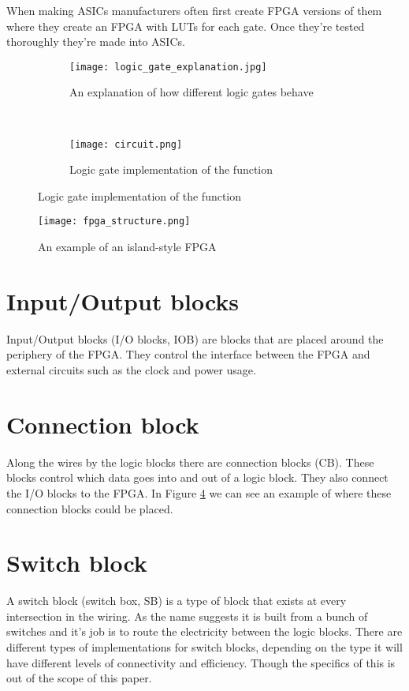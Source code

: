 When making ASICs manufacturers often first create FPGA versions of them where
they create an FPGA with LUTs for each gate. Once they're tested thoroughly
they're made into ASICs.

\begin{figure}[H]
    \centering
    \begin{subfigure}[b]{.4\textwidth}
        \centering
        \texttt{[image: logic\_gate\_explanation.jpg]}
        \caption{An explanation of how different logic gates behave\citep{LogicGateBehavior}}
        \label{fig:logic_gate_explanation}
    \end{subfigure}
    ~
    \begin{subfigure}[b]{.4\textwidth}
        \centering
        \texttt{[image: circuit.png]}
        \caption{Logic gate implementation of the function}
        \label{fig:logic_gate_impl}
    \end{subfigure}
\end{figure}

\begin{figure}[H]
    \centering
    \texttt{[image: fpga\_structure.png]}
    \caption{An example of an island-style FPGA\citep{M.MorrisMano3}}
    \label{fig:fpga_structure}
\end{figure}

\section{Input/Output blocks}
Input/Output blocks (I/O blocks, IOB) are blocks that are placed around the
periphery of the FPGA. They control the interface between the FPGA and external
circuits such as the clock and power usage.

\section{Connection block}
Along the wires by the logic blocks there are connection blocks (CB). These blocks
control which data goes into and out of a logic block. They also connect the
I/O blocks to the FPGA. In Figure \ref{fig:fpga_structure} we can see an
example of where these connection blocks could be placed.

\section{Switch block}
A switch block (switch box, SB) is a type of block that exists at every
intersection in the wiring. As the name suggests it is built from a bunch of
switches and it's job is to route the electricity between the logic blocks.
There are different types of implementations for switch blocks, depending on
the type it will have different levels of connectivity and efficiency. Though
the specifics of this is out of the scope of this paper.

